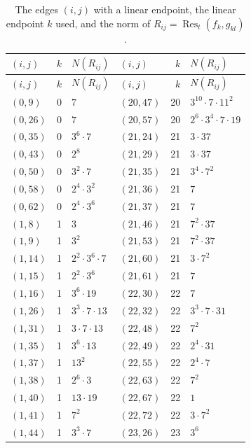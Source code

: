 \documentclass[11pt]{article}
\begin{document}
\begingroup\small
\setlength{\LTcapwidth}{\textwidth}
\begin{longtable}{@{}lrl@{\qquad}lrl@{}}
\caption{The edges $(i,j)$ with a linear endpoint, the linear endpoint $k$ used, and the norm of $R_{ij}=\operatorname{Res}_t(f_k,g_{kl})$.}\label{tab:sep}\\
\hline $(i,j)$ & $k$ & $N(R_{ij})$ & $(i,j)$ & $k$ & $N(R_{ij})$\\\hline\endfirsthead\hline $(i,j)$ & $k$ & $N(R_{ij})$ & $(i,j)$ & $k$ & $N(R_{ij})$\\\hline\endhead\hline\endfoot
$(0,9)$ & 0 & $7$ & $(20,47)$ & 20 & $3^{10}\cdot 7\cdot 11^{2}$\\
$(0,26)$ & 0 & $7$ & $(20,57)$ & 20 & $2^{6}\cdot 3^{4}\cdot 7\cdot 19$\\
$(0,35)$ & 0 & $3^{6}\cdot 7$ & $(21,24)$ & 21 & $3\cdot 37$\\
$(0,43)$ & 0 & $2^{8}$ & $(21,29)$ & 21 & $3\cdot 37$\\
$(0,50)$ & 0 & $3^{2}\cdot 7$ & $(21,35)$ & 21 & $3^{4}\cdot 7^{2}$\\
$(0,58)$ & 0 & $2^{4}\cdot 3^{2}$ & $(21,36)$ & 21 & $7$\\
$(0,62)$ & 0 & $2^{4}\cdot 3^{6}$ & $(21,37)$ & 21 & $7$\\
$(1,8)$ & 1 & $3$ & $(21,46)$ & 21 & $7^{2}\cdot 37$\\
$(1,9)$ & 1 & $3^{2}$ & $(21,53)$ & 21 & $7^{2}\cdot 37$\\
$(1,14)$ & 1 & $2^{2}\cdot 3^{6}\cdot 7$ & $(21,60)$ & 21 & $3\cdot 7^{2}$\\
$(1,15)$ & 1 & $2^{2}\cdot 3^{6}$ & $(21,61)$ & 21 & $7$\\
$(1,16)$ & 1 & $3^{6}\cdot 19$ & $(22,30)$ & 22 & $7$\\
$(1,26)$ & 1 & $3^{3}\cdot 7\cdot 13$ & $(22,32)$ & 22 & $3^{3}\cdot 7\cdot 31$\\
$(1,31)$ & 1 & $3\cdot 7\cdot 13$ & $(22,48)$ & 22 & $7^{2}$\\
$(1,35)$ & 1 & $3^{6}\cdot 13$ & $(22,49)$ & 22 & $2^{4}\cdot 31$\\
$(1,37)$ & 1 & $13^{2}$ & $(22,55)$ & 22 & $2^{4}\cdot 7$\\
$(1,38)$ & 1 & $2^{6}\cdot 3$ & $(22,63)$ & 22 & $7^{2}$\\
$(1,40)$ & 1 & $13\cdot 19$ & $(22,67)$ & 22 & $1$\\
$(1,41)$ & 1 & $7^{2}$ & $(22,72)$ & 22 & $3\cdot 7^{2}$\\
$(1,44)$ & 1 & $3^{3}\cdot 7$ & $(23,26)$ & 23 & $3^{6}$\\

\end{longtable}
\end{document}
